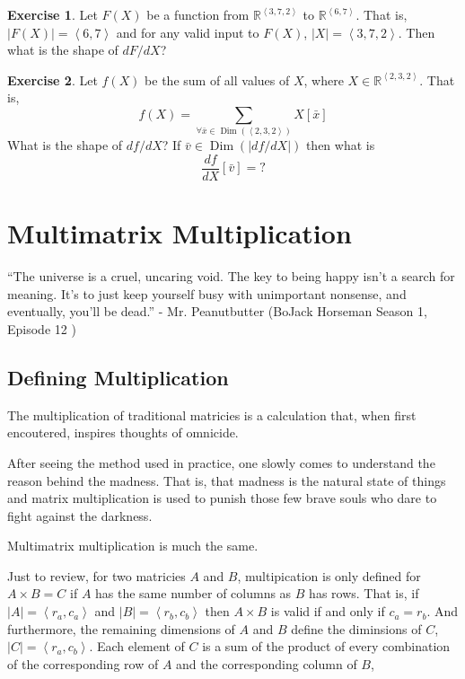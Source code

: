 \documentclass[12pt]{book}
\theoremstyle{plain}
\theoremstyle{definition}
\newtheorem{exercise}{Exercise}[chapter]
\theoremstyle{ppart}
\theoremstyle{case}
\theoremstyle{solution}
\DeclareMathOperator{\Dim}{Dim}
\newcommand{\shape}[1]{\left|#1\right|}
\begin{document}
\begin{exercise}
Let $F(X)$ be a function from $\mathbb{R}^{\left<3,7,2\right>}$ to
$\mathbb{R}^{\left<6, 7\right>}$. That is, $\shape{F(X)} = \left<6,7\right>$
and for any valid input to $F(X)$, $\shape{X} = \left<3,7,2\right>$.
Then what is the shape of $dF/dX$?
\end{exercise}

\begin{exercise}
Let $f(X)$ be the sum of all values of $X$, where
$X \in \mathbb{R}^{\left<2,3,2\right>}$. That is,
\[ f(X) = \sum_{\forall \bar{x} \in \Dim(\left<2,3,2\right>)} X[\bar{x}] \]
What is the shape of $df/dX$? If $\bar{v} \in \Dim(\shape{df/dX})$ then what is
\[ \frac{df}{dX}[\bar{v}] = ? \]
\end{exercise}

\chapter{Multimatrix Multiplication}

\begin{displayquote}
``The universe is a cruel, uncaring void. The key to being happy isn't a search
for meaning. It's to just keep yourself busy with unimportant nonsense, and eventually,
you'll be dead.'' - Mr. Peanutbutter (BoJack Horseman Season 1, Episode 12
\cite{bojack})
\end{displayquote}

\section{Defining Multiplication}

The multiplication of traditional matricies is a calculation that, when first
encoutered, inspires thoughts of omnicide.

After seeing the method used in practice, one slowly comes to understand the
reason behind the madness. That is, that madness is the natural state of things
and matrix multiplication is used to punish those few brave souls who dare to
fight against the darkness.

Multimatrix multiplication is much the same.

Just to review, for two matricies $A$ and $B$, multipication is only defined
for $A \times B = C$ if $A$ has the same number of columns as $B$ has rows.
That is, if $\shape{A} = \left< r_a, c_a \right>$ and $\shape{B} = \left< r_b, c_b \right>$
then $A \times B$ is valid if and only if $c_a = r_b$. And furthermore,
the remaining dimensions of $A$ and $B$ define the diminsions of $C$,
$\shape{C} = \left< r_a, c_b \right>$. Each element of $C$ is a sum of the product of
every combination of the corresponding row of $A$ and the corresponding column of
$B$,
\end{document}
